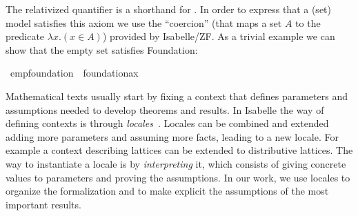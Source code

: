 \noindent The relativized quantifier
 is a shorthand for \isa{{\isasymforall}x{\isachardot}\ M(x)
  {\isasymlongrightarrow} P(x)}. In order to express that a (set) model
satisfies this axiom we use  the ``coercion''
 (that maps a set $A$ to the predicate
$\lambda x . (x\in A)$) provided by Isabelle/ZF. As a trivial example we
can show that the empty set satisfies Foundation:
\begin{isabelle}
\isamarkupfalse%
\ emp{\isacharunderscore}foundation\ {\isacharcolon}\ {\isachardoublequoteopen}foundation{\isacharunderscore}ax{\isacharparenleft}{\isacharhash}{\isacharhash}{}{\isacharparenright}{\isachardoublequoteclose}
\end{isabelle}




Mathematical texts usually start by fixing a context that defines
parameters and assumptions needed to develop theorems
and results. In Isabelle the way of defining contexts is through
\emph{locales}~\cite{ballarin2010tutorial}.
Locales can be combined and extended adding more parameters and assuming
more facts, leading to a new locale. For example a context describing
lattices can be extended to distributive lattices.
The way to instantiate a locale is by \emph{interpreting} it, which consists
of giving concrete values to parameters and proving the assumptions.
In our work, we use locales to organize the formalization and to make
explicit the assumptions of the most important results.



